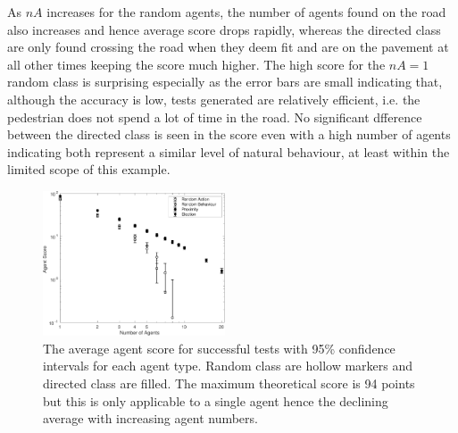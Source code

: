\documentclass[letterpaper, 10 pt, journal, twoside]{IEEEtran}
\begin{document}

As $nA$ increases for the random agents, the number of agents found on the road also increases and hence average score drops rapidly, whereas the directed class are only found crossing the road when they deem fit and are on the pavement at all other times keeping the score much higher.
%
%
The high score for the $nA=1$ random class is surprising especially as the error bars are small indicating that, although the accuracy is low, tests generated are relatively efficient, i.e. the pedestrian does not spend a lot of time in the road.
%
No significant dfference between the directed class is seen in the score even with a high number of agents indicating both represent a similar level of natural behaviour, at least within the limited scope of this example.


\begin{figure}[!t]
	\centering
\includegraphics[width=0.48\textwidth]{AgentScore.pdf}
	\caption{The average agent score for successful tests with 95\% confidence intervals for each agent type. Random class are hollow markers and directed class are filled. The maximum theoretical score is 94 points but this is only applicable to a single agent hence the declining average with increasing agent numbers.}
	\label{AgentScore}
\end{figure}


\end{document}
